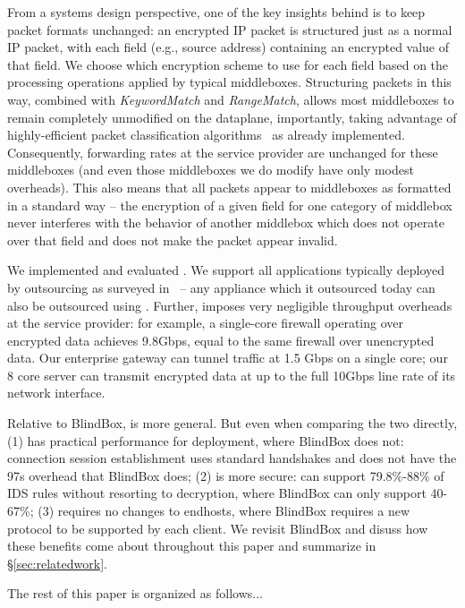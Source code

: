   From a systems design perspective, one of the key insights behind \sys is to keep packet formats unchanged: an encrypted IP packet is structured just as a normal IP packet, with each field (e.g., source address) containing an encrypted value of that field.
  We choose which encryption scheme to use for each field based on the processing operations applied by typical middleboxes.
  Structuring packets in this way, combined with {\it KeywordMatch} and {\it RangeMatch}, allows most middleboxes to remain completely unmodified on the dataplane, importantly, taking advantage of highly-efficient packet classification algorithms~\cite{somethingclassification--chang?} as already implemented.
  Consequently, forwarding rates at the service provider are unchanged for these middleboxes (and even those middleboxes we do modify have only modest overheads).
  This also means that all packets appear to middleboxes as formatted in a standard way -- the encryption of a given field for one category of middlebox never interferes with the behavior of another middlebox which does not operate over that field and does not make the packet appear invalid. 

We implemented and evaluated \sys. We support all applications typically deployed by outsourcing as surveyed in~\cite{aplomb} -- any appliance which it outsourced today can also be outsourced using \sys.
Further, \sys imposes very negligible throughput overheads at the service provider: for example, a single-core firewall operating over encrypted data achieves 9.8Gbps, equal to the same firewall over unencrypted data.
Our enterprise gateway can tunnel traffic at 1.5 Gbps on a single core;  our 8 core server can transmit \sys encrypted data at up to the full 10Gbps line rate of its network interface.

Relative to BlindBox, \sys is more general. But even when comparing the two directly, \sys (1) has practical performance for deployment, where BlindBox does not: connection session establishment uses standard handshakes and does not have the 97s overhead that BlindBox does; (2) is more secure: \sys can support 79.8\%-88\% of IDS rules without resorting to decryption, where BlindBox can only support 40-67\%; (3) requires no changes to endhosts, where BlindBox requires a new protocol to be supported by each client. 
We revisit BlindBox and disuss how these benefits come about throughout this paper and summarize in \S\ref{sec:relatedwork}.

The rest of this paper is organized as follows...
